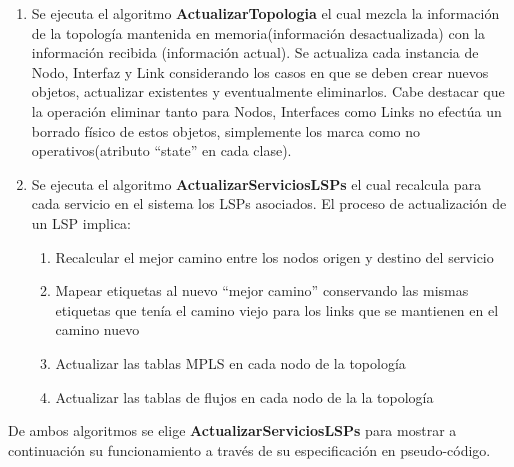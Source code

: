 \begin{enumerate}
\item Se ejecuta el algoritmo \textbf{ActualizarTopologia} el cual mezcla la informaci\'on de la topolog\'ia mantenida en memoria(informaci\'on desactualizada) con la informaci\'on recibida (informaci\'on actual). Se actualiza cada instancia de Nodo, Interfaz y Link considerando los casos en que se deben crear nuevos objetos, actualizar existentes y eventualmente eliminarlos. Cabe destacar que la operaci\'on eliminar tanto para Nodos, Interfaces como Links no efectúa un borrado f\'isico de estos objetos, simplemente los marca como no operativos(atributo “state” en cada clase).  

\item Se ejecuta el algoritmo \textbf{ActualizarServiciosLSPs} el cual recalcula para cada servicio en el sistema los LSPs asociados. El proceso de actualización de un LSP implica:

\begin{enumerate}
\item Recalcular el mejor camino entre los nodos origen y destino del servicio
\item Mapear etiquetas al nuevo “mejor camino” conservando las mismas etiquetas que ten\'ia el camino viejo para los links que se mantienen en el camino nuevo
\item Actualizar las tablas MPLS en cada nodo de la topolog\'ia
\item Actualizar las tablas de flujos en cada nodo de la la topolog\'ia  
\end{enumerate}

\end{enumerate}    

De ambos algoritmos se elige \textbf{ActualizarServiciosLSPs} para mostrar a continuaci\'on su funcionamiento a trav\'es de su especificaci\'on en pseudo-c\'odigo.
 
